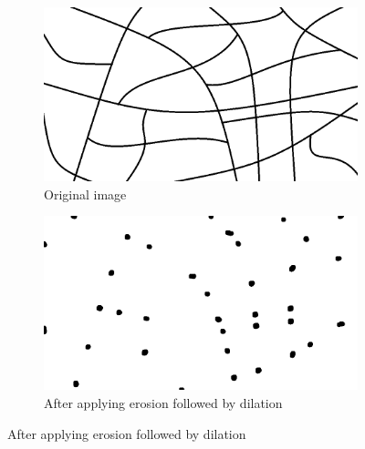 \documentclass[a4paper]{article}
\begin{document}
\begin{figure}[htp]
\centering
\begin{subfigure}{.5\textwidth}
  \centering
  \includegraphics[width=.9\linewidth]{Image2}
  \caption{Original image}
  \label{fig:sub1}
\end{subfigure}%
\begin{subfigure}{.5\textwidth}
  \centering
  \includegraphics[width=.9\linewidth]{ex3.2}
  \caption{After applying erosion followed by dilation}
  \label{fig:sub2}
\end{subfigure}
\captionsetup{format=empty}
\label{fig:test}
\end{figure}
\end{document}
